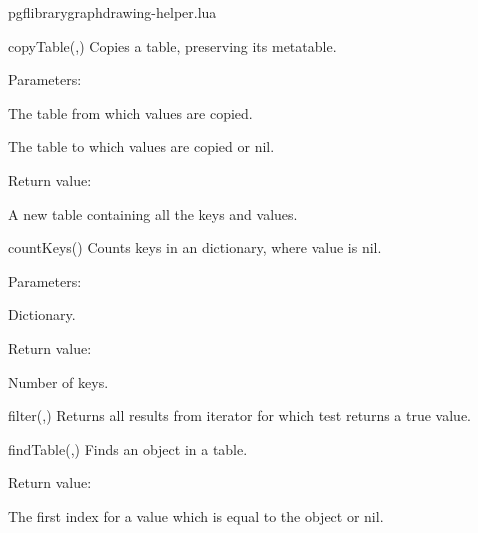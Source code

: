 
\begin{filedescription}{pgflibrarygraphdrawing-helper.lua}


\begin{luacommand}{{copyTable}(,)}
Copies a table, preserving its metatable.

Parameters:
\begin{parameterdescription}
	\item[\meta{table}] The table from which values are copied.\item[\meta{result}] The table to which values are copied or nil.
\end{parameterdescription}


Return value:
\begin{parameterdescription} 
  \item[] A new table containing all the keys and values.
\end{parameterdescription}


\end{luacommand}
\begin{luacommand}{{countKeys}()}
Counts keys in an dictionary, where value is nil.

Parameters:
\begin{parameterdescription}
	\item[\meta{table}] Dictionary.
\end{parameterdescription}


Return value:
\begin{parameterdescription} 
  \item[] Number of keys.
\end{parameterdescription}


\end{luacommand}
\begin{luacommand}{{filter}(,)}
Returns all results from iterator for which test returns a true value.



\end{luacommand}
\begin{luacommand}{{findTable}(,)}
Finds an object in a table.


Return value:
\begin{parameterdescription} 
  \item[] The first index for a value which is equal to the object or nil.
\end{parameterdescription}



\end{luacommand}
\end{filedescription}
